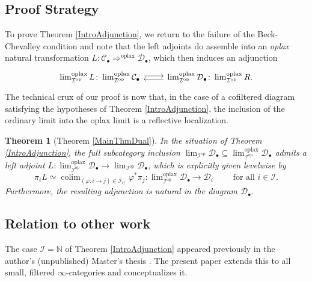 \documentclass[a4paper,reqno,10pt]{amsart}
\newtheorem{introtheorem}{Theorem}
\theoremstyle{definition}
\theoremstyle{remark}
\newcommand{\N}{\mathbb{N}}
\newcommand{\C}{\mathcal{C}}
\newcommand{\D}{\mathcal{D}}
\newcommand{\I}{\mathcal{I}}
\DeclareMathOperator*{\colim}{colim}
\newcommand{\oplax}{\mathrm{oplax}}
\newcommand{\op}{\mathrm{op}}
\newcommand{\Adj}{\arrow[r,shift left=0.2em]\arrow[r,leftarrow,shift right=0.2em]}
\begin{document}
\subsection*{Proof Strategy} To prove Theorem \ref{IntroAdjunction}, we return to the failure of the Beck-Chevalley condition and note that the left adjoints do assemble into an \textit{oplax} natural transformation $L\colon\C_{\bullet}\Rightarrow^{\oplax}\D_{\bullet}$, which then induces an adjunction
\begin{equation*}
\begin{tikzcd}
\lim_{\I^{\op}}^{\oplax}L\colon\lim_{\I^{\op}}^{\oplax}\C_{\bullet}\Adj & \lim_{\I^{\op}}^{\oplax}\D_{\bullet}\colon\lim_{\I^{\op}}^{\oplax}R.
\end{tikzcd}
\end{equation*}
The technical crux of our proof is now that, in the case of a cofiltered diagram satisfying the hypotheses of Theorem \ref{IntroAdjunction}, the inclusion of the ordinary limit into the oplax limit is a reflective localization.

\begin{introtheorem}[Theorem \ref{MainThmDual}]\label{IntroReflection}
In the situation of Theorem \ref{IntroAdjunction}, the full subcategory inclusion $\lim_{\I^{\op}}\D_{\bullet}\subseteq\lim_{\I^{\op}}^{\oplax}\D_{\bullet}$ admits a left adjoint $L\colon\lim^{\oplax}_{\I^{\op}}\D_{\bullet}\rightarrow\lim_{\I^{\op}}\D_{\bullet}$, which is explicitly given levelwise by
\begin{equation*}
\pi_iL\simeq\colim_{(\varphi\colon i\rightarrow j)\in\I_{i/}}\varphi^{\ast}\pi_j\colon\lim\nolimits_{\I^{\op}}^{\oplax}\D_{\bullet}\rightarrow\D_i\qquad\text{ for all }i\in\I.
\end{equation*}
Furthermore, the resulting adjunction is natural in the diagram $\D_{\bullet}$.
\end{introtheorem}


\subsection*{Relation to other work}

The case $\I=\N$ of Theorem \ref{IntroAdjunction} appeared previously in the author's (unpublished) Master's thesis \cite[Appendix B]{Geiss}. The present paper extends this to all small, filtered $\infty$-categories and conceptualizes it.
\end{document}
